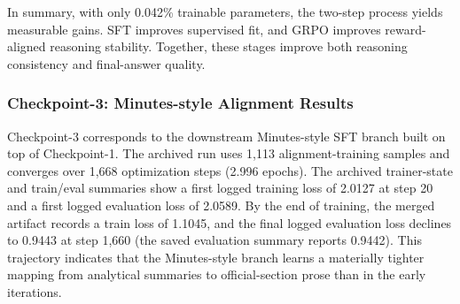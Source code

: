 
% 



In summary, with only 0.042\% trainable parameters, the two-step process yields measurable gains. SFT improves supervised fit, and GRPO improves reward-aligned reasoning stability. Together, these stages improve both reasoning consistency and final-answer quality.

\subsubsection*{Checkpoint-3: Minutes-style Alignment Results}

Checkpoint-3 corresponds to the downstream Minutes-style SFT branch built on top of Checkpoint-1. The archived run uses 1,113 alignment-training samples and converges over 1,668 optimization steps (2.996 epochs). The archived trainer-state and train/eval summaries show a first logged training loss of 2.0127 at step 20 and a first logged evaluation loss of 2.0589. By the end of training, the merged artifact records a train loss of 1.1045, and the final logged evaluation loss declines to 0.9443 at step 1,660 (the saved evaluation summary reports 0.9442). This trajectory indicates that the Minutes-style branch learns a materially tighter mapping from analytical summaries to official-section prose than in the early iterations.

